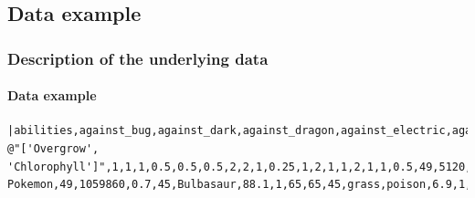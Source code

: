 \documentclass{beamer}
\begin{document}
		\subsection{Data example}
		\begin{frame}[fragile]
			\frametitle{Description of the underlying data}
			\framesubtitle{Data example}
			\begin{lstlisting}[style=mylisting, basicstyle=\small\ttfamily]
|abilities,against_bug,against_dark,against_dragon,against_electric,against_fairy,against_fight,against_fire,against_flying,against_ghost,against_grass,against_ground,against_ice,against_normal,against_poison,against_psychic,against_rock,against_steel,against_water,attack,base_egg_steps,base_happiness,base_total,capture_rate,classfication,defense,experience_growth,height_m,hp,name,percentage_male,pokedex_number,sp_attack,sp_defense,speed,type1,type2,weight_kg,generation,is_legendary|
@"['Overgrow', 'Chlorophyll']",1,1,1,0.5,0.5,0.5,2,2,1,0.25,1,2,1,1,2,1,1,0.5,49,5120,70,318,45,Seed Pokemon,49,1059860,0.7,45,Bulbasaur,88.1,1,65,65,45,grass,poison,6.9,1,0@
			\end{lstlisting}
		\end{frame}
\end{document}
